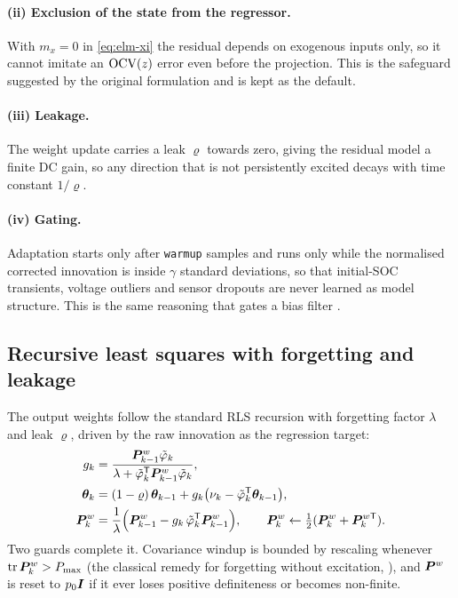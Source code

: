 \paragraph{(ii) Exclusion of the state from the regressor.}  With $m_x = 0$ in \cref{eq:elm-xi} the
residual depends on exogenous inputs only, so it cannot imitate an $\mathrm{OCV}(z)$ error even before
the projection.  This is the safeguard suggested by the original formulation and is kept as the
default.

\paragraph{(iii) Leakage.}  The weight update carries a leak $\varrho$ towards zero, giving the
residual model a finite DC gain, so any direction that is not persistently excited decays with time
constant $1/\varrho$.

\paragraph{(iv) Gating.}  Adaptation starts only after \texttt{warmup} samples and runs only while
the normalised corrected innovation is inside $\gamma$ standard deviations, so that initial-SOC
transients, voltage outliers and sensor dropouts are never learned as model structure.  This is the
same reasoning that gates a bias filter \citep{friedland1969bias}.

\subsection{Recursive least squares with forgetting and leakage}
The output weights follow the standard RLS recursion \citep{ljung1999} with forgetting factor
$\lambda$ and leak $\varrho$, driven by the raw innovation as the regression target:
\begin{align}
g_k &= \frac{\bm{P}^w_{k-1}\tilde\varphi_k}{\lambda + \tilde\varphi_k^{\mathsf{T}} \bm{P}^w_{k-1}\tilde\varphi_k},
\label{eq:elm-rls1}\\
\bm{\theta}_k &= (1-\varrho)\,\bm{\theta}_{k-1} + g_k\bigl(\nu_k - \tilde\varphi_k^{\mathsf{T}}\bm{\theta}_{k-1}\bigr),
\label{eq:elm-rls2}\\
\bm{P}^w_k &= \frac{1}{\lambda}\Bigl(\bm{P}^w_{k-1} - g_k\,\tilde\varphi_k^{\mathsf{T}} \bm{P}^w_{k-1}\Bigr),
\qquad \bm{P}^w_k \leftarrow \tfrac12(\bm{P}^w_k + \bm{P}^{w\mathsf{T}}_k).
\label{eq:elm-rls3}
\end{align}
Two guards complete it.  Covariance windup is bounded by rescaling whenever
$\operatorname{tr}\bm{P}^w_k > P_{\max}$ (the classical remedy for forgetting without excitation,
\citealp{ljung1999}), and $\bm{P}^w$ is reset to $p_0\bm{I}$ if it ever loses positive definiteness or
becomes non-finite.

